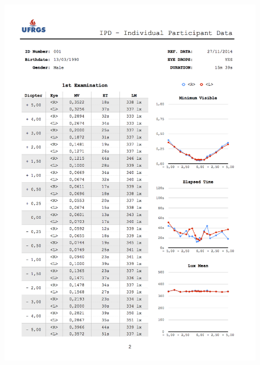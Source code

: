 \begin{figure}[h]
	
	\centering
	\includegraphics[width=1.0\linewidth]{__Images/08/IPD_001_2.png}
\end{figure}

